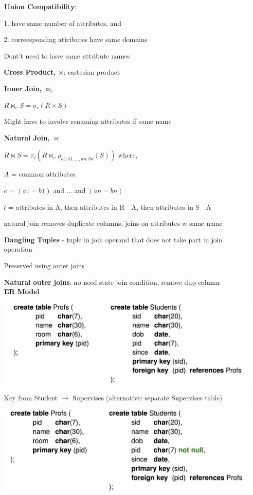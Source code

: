 \documentclass[10pt, a4paper]{article}
\newcommand{\header}[1]{{\normalsize\textbf{#1}}}
\newcommand{\tab}[0]{\hspace*{2mm}}
\begin{document}
\begin{multicols*}{3}
		\textbf{Union Compatibility}: 

		\tab 1. have same number of attributes, and

		\tab 2. correesponding attributes have same domains

		Dont't need to have same attribute names

		\textbf{Cross Product, $\times$}: cartesian product

		\textbf{Inner Join, $\Join _c$}		

		$R \Join _c S = \sigma _c(R \times S)$

		Might have to involve renaming attributes if same name

		\textbf{Natural Join, $\Join$}

		$R \Join S = \pi _l(R \Join _c \rho _{a1:b1, \dots, an:bn}(S))$
		where,

		$A$ = common attributes

		$c$ = $(a1 = b1)$ and ... and $(an = bn)$

		$l$ = attributes in A, then attributes in R - A, then attributes in S - A

		natural join removes duplicate columns, joins on attributes w same name
		
		\textbf{Dangling Tuples} - tuple in join operand that does not take part in join operation

		Preserved using \underline{outer joins}

		\textbf{Natural outer joins}: no need state join condition, remove dup column\\

		\header{ER Model}

		\includegraphics[scale=.23]{./assets/keyConstraint.png}

		Key from Student $\rightarrow$ Supervises (alternative: separate Supervises table)

		\includegraphics[scale=.23]{./assets/keyAndTotalConstraint.png}
		

\end{multicols*}
\end{document}
